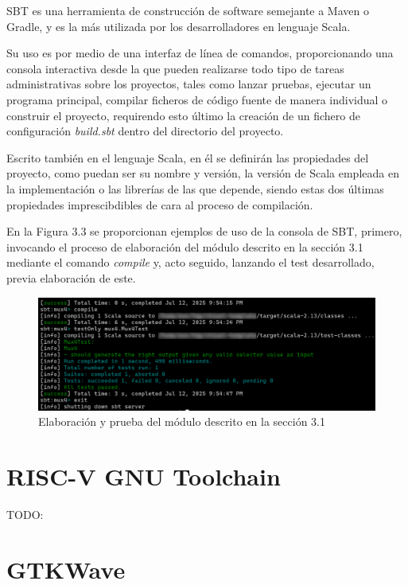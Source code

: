 SBT es una herramienta de construcción de software semejante a Maven o Gradle, y es la más utilizada por los desarrolladores en lenguaje Scala\cite{scalaSurvey}.

Su uso es por medio de una interfaz de línea de comandos, proporcionando una consola interactiva desde la que pueden realizarse todo tipo de tareas administrativas sobre los proyectos, tales como lanzar pruebas, ejecutar un programa principal, compilar ficheros de código fuente de manera individual o construir el proyecto, requirendo esto último la creación de un fichero de configuración \textit{build.sbt} dentro del directorio del proyecto.

Escrito también en el lenguaje Scala, en él se definirán las propiedades del proyecto, como puedan ser su nombre y versión, la versión de Scala empleada en la implementación o las librerías de las que depende, siendo estas dos últimas propiedades imprescibdibles de cara al proceso de compilación.

En la Figura 3.3 se proporcionan ejemplos de uso de la consola de SBT, primero, invocando el proceso de elaboración del módulo descrito en la sección 3.1 mediante el comando \textit{compile} y, acto seguido, lanzando el test desarrollado, previa elaboración de este.

\begin{figure}[h]
  \centering
  \includegraphics[width=0.75\linewidth]{res/img/sbt-usage-basic.png}
  \caption{Elaboración y prueba del módulo descrito en la sección 3.1}
\end{figure}

\section{RISC-V GNU Toolchain}

TODO:

\section{GTKWave}

